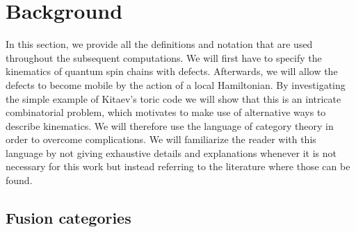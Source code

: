 \documentclass[aps,prb,twocolumn,superscriptaddress,noshowkeys]{revtex4-1}  %
\theoremstyle{plain}%
\theoremstyle{definition}
\theoremstyle{remark}
\begin{document}
\section{Background}\label{S:defs}
In this section, we provide all the definitions and notation that are used throughout the subsequent computations. We will first have to specify the kinematics of quantum spin chains with defects. Afterwards, we will allow the defects to become mobile by the action of a local Hamiltonian. By investigating the simple example of Kitaev's toric code \cite{Kit03} we will show that this is an intricate combinatorial problem, which motivates to make use of alternative ways to describe kinematics. We will therefore use the language of category theory in order to overcome complications. We will familiarize the reader with this language by not giving exhaustive details and explanations whenever it is not necessary for this work but instead referring to the literature where those can be found.

\subsection{Fusion categories}
\end{document}
